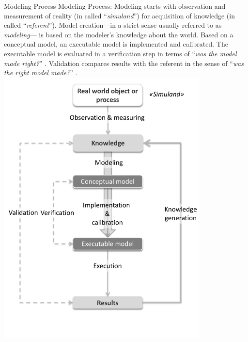 \createfigure%
{Modeling Process}%
{Modeling Process: Modeling starts with observation and measurement of reality (in \citet[][]{Petty_SokolowskiBanks_2010} called ``\emph{simuland}'') for acquisition of knowledge (in \citet[][]{Petty_SokolowskiBanks_2010} called ``\emph{referent}''). Model creation---in a strict sense usually referred to as \emph{modeling}--- is based on the modeler's knowledge about the world. Based on a conceptual model, an executable model is implemented and calibrated. The executable model is evaluated in a verification step in terms of ``\emph{was the model made right?}'' \citet[][p.332]{Petty_SokolowskiBanks_2010}. Validation compares results with the referent in the sense of ``\emph{was the right model made?}'' \citet[][p.332]{Petty_SokolowskiBanks_2010}.}%
{\label{fig:modeling}}%
{\includegraphics[width=0.8\textwidth, angle=0]{using/figures/modeling.pdf}}%
{}

